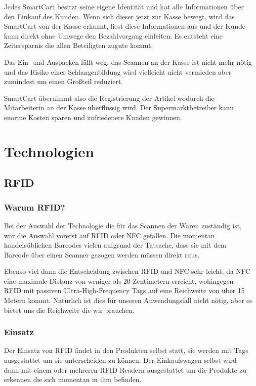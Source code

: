 \documentclass{sigchi}
\begin{document}
Jedes SmartCart besitzt seine eigene Identität und hat alle Informationen über den Einkauf des Kunden. Wenn sich dieser jetzt zur Kasse bewegt, wird das SmartCart von der Kasse erkannt, liest diese Informationen aus und der Kunde kann direkt ohne Umwege den Bezahlvorgang einleiten. Es entsteht eine Zeitersparnis die allen Beteiligten zugute kommt. 

Das Ein- und Auspacken fällt weg, das Scannen an der Kasse ist nicht mehr nötig und das Risiko einer Schlangenbildung wird vielleicht nicht vermieden aber zumindest um einen Großteil reduziert. 

SmartCart übernimmt also die Registrierung der Artikel wodurch die Mitarbeiterin an der Kasse überflüssig wird. Der Supermarktbetreiber kann enorme Kosten sparen und zufriedenere Kunden gewinnen.


\section{Technologien}
\subsection{RFID}
\subsubsection{Warum RFID?}
Bei der Auswahl der Technologie die für das Scannen der Waren zuständig ist, war die Auswahl vorerst auf RFID oder NFC gefallen. Die momentan handelsüblichen Barcodes vielen aufgrund der Tatsache, dass sie mit dem Barcode über einen Scanner gezogen werden müssen direkt raus.

Ebenso viel dann die Entscheidung zwischen RFID und NFC sehr leicht, da NFC eine maximale Distanz von weniger als 20 Zentimetern erreicht, wohingegen RFID mit passiven Ultra-High-Frequency Tags auf eine Reichweite von über 15 Metern kommt. Natürlich ist dies für unseren Anwendungsfall nicht nötig, aber es bietet uns die Reichweite die wir brauchen.


\subsubsection{Einsatz}
Der Einsatz von RFID findet in den Produkten selbst statt, sie werden mit Tags ausgestattet um sie unterscheiden zu können. Der Einkaufswagen selbst wird dann mit einem oder mehreren RFID Readern ausgestattet um die Produkte zu erkennen die sich momentan in ihm befinden.
\end{document}
